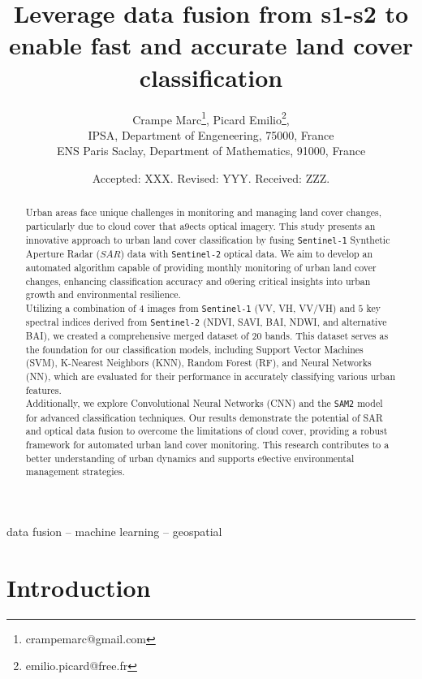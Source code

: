 \documentclass[usenatbib]{tjaa}
\title[Short Title max 45 chars]{Leverage data fusion from s1-s2 to enable\newline  
fast and accurate land cover classification}
\author[F. Author \others]{%
Crampe Marc\autid{1}{0000-0000-0000-0000}\thanks{crampemarc@gmail.com},
Picard Emilio\autid{2}{0000-0000-0000-0000}\thanks{emilio.picard@free.fr},
\\
\adrid{1}IPSA, Department of Engeneering, 75000, France\\
\adrid{2}ENS Paris Saclay, Department of Mathematics, 91000, France\\
}%
\date{Accepted: XXX. Revised: YYY. Received: ZZZ.}
\begin{document}
\label{firstpage}
\pagerange{\pageref{firstpage}--\pageref{lastpage}}

\begin{abstract}
  Urban areas face unique challenges in monitoring and managing land cover changes,
  particularly due to cloud cover that a9ects optical imagery. This study presents an innovative
  approach to urban land cover classification by fusing \texttt{Sentinel-1} Synthetic Aperture Radar ($SAR$)
  data with \texttt{Sentinel-2} optical data. We aim to develop an automated algorithm capable of
  providing monthly monitoring of urban land cover changes, enhancing classification accuracy
  and o9ering critical insights into urban growth and environmental resilience.
  \\
  Utilizing a combination of $4$ images from \texttt{Sentinel-1} (VV, VH, VV/VH) and $5$ key spectral indices
  derived from \texttt{Sentinel-2} (NDVI, SAVI, BAI, NDWI, and alternative BAI), we created a
  comprehensive merged dataset of $20$ bands. This dataset serves as the foundation for our
  classification models, including Support Vector Machines (SVM), K-Nearest Neighbors (KNN),
  Random Forest (RF), and Neural Networks (NN), which are evaluated for their performance in
  accurately classifying various urban features.
  \\
  Additionally, we explore Convolutional Neural Networks (CNN) and the \texttt{SAM2} model for
  advanced classification techniques. Our results demonstrate the potential of SAR and optical
  data fusion to overcome the limitations of cloud cover, providing a robust framework for
  automated urban land cover monitoring. This research contributes to a better understanding of
  urban dynamics and supports e9ective environmental management strategies. \cite{einstein1905}
\end{abstract} 

\begin{keywords}
data fusion -- machine learning -- geospatial
\end{keywords}

\section{Introduction}
\end{document}
